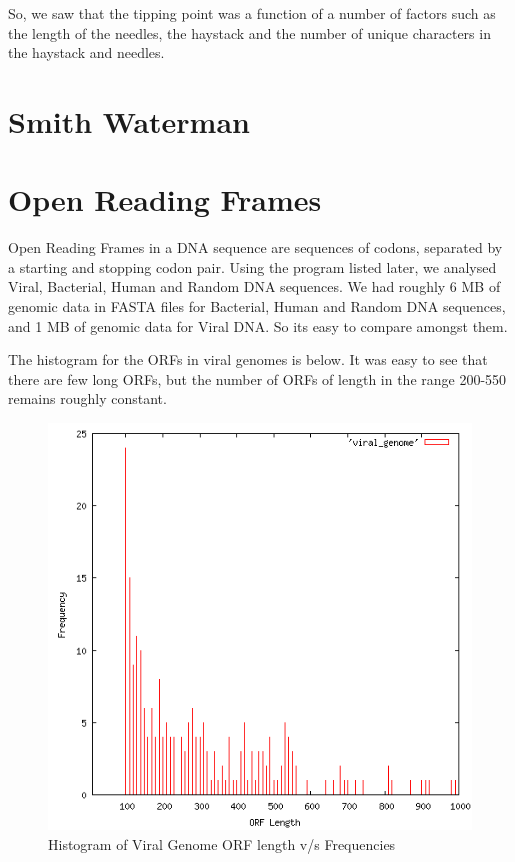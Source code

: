 \documentclass{article}
\begin{document}
So, we saw that the tipping point was a function of a number of factors such as the length of the needles, the haystack and the number of unique characters in the haystack and needles. \\

\clearpage

\clearpage

\clearpage

\section{Smith Waterman}
\clearpage

\section{Open Reading Frames}
Open Reading Frames in a DNA sequence are sequences of codons, separated by a starting and stopping codon pair. Using the program listed later, we analysed Viral, Bacterial, Human and Random DNA sequences. We had roughly 6 MB of genomic data in FASTA files for Bacterial, Human and Random DNA sequences, and 1 MB of genomic data for Viral DNA. So its easy to compare amongst them.

The histogram for the ORFs in viral genomes is below. It was easy to see that there are few long ORFs, but the number of ORFs of length in the range 200-550 remains roughly constant.

\begin{figure}[htp]
\centering
\includegraphics[scale=0.5]{viral_genome.png}
\caption{Histogram of Viral Genome ORF length v/s Frequencies}\label{fig:fs}
\end{figure}
\end{document}
